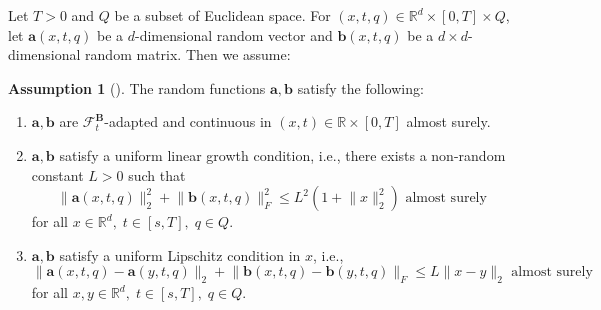 \documentclass[12pt]{article}
\theoremstyle{definition}
\newtheorem{assumption}[assumption]{Assumption}
\numberwithin{equation}{section}
\newcommand{\R}{\mathbb{R}}
\newcommand{\CF}{\mathcal{F}}
\newcommand{\norm}[1]{\lVert{#1}\rVert_2}
\newcommand{\normf}[1]{\lVert{#1}\rVert_F}
\begin{document}
Let $T > 0$ and $Q$ be a subset of Euclidean space. For $(x,t,q) \in \R^d \times [0,T] \times Q$, let $\mathbf{a}(x,t,q)$ be a $d$-dimensional random vector and $\mathbf{b}(x,t,q)$ be a $d \times d$-dimensional random matrix. Then we assume: 
\begin{assumption}[]
  \label{as:sde_existence}
  The random functions $\mathbf{a},\mathbf{b}$ satisfy the following:
  \begin{enumerate}[label=(\roman*)]
    \item $\mathbf{a},\mathbf{b}$ are $\CF^\mathbf{B}_t$-adapted and continuous in $(x,t) \in \R \times [0,T]$ almost surely.
    \item $\mathbf{a},\mathbf{b}$ satisfy a uniform linear growth condition, i.e., there exists a non-random constant $L > 0$ such that
    \begin{equation*}
      \norm{\mathbf{a}(x,t,q)}^2 + \normf{\mathbf{b}(x,t,q)}^2 \leq L^2 (1 + \norm{x}^2) \text{ almost surely}
    \end{equation*}
    for all $x \in \R^d, \; t \in [s,T], \; q \in Q$.
    \item $\mathbf{a},\mathbf{b}$ satisfy a uniform Lipschitz condition in $x$, i.e.,
    \begin{equation*}
      \norm{\mathbf{a}(x,t,q) - \mathbf{a}(y,t,q)} + \normf{\mathbf{b}(x,t,q) - \mathbf{b}(y,t,q)} \leq L \norm{x - y}  \text{ almost surely}
    \end{equation*}
    for all $x,y \in \R^d, \; t \in [s, T], \; q \in Q$.
  \end{enumerate}
\end{assumption}
\end{document}

